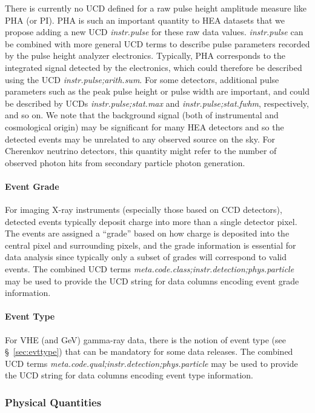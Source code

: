 \documentclass[11pt,a4paper]{ivoa}
\begin{document}
There is currently no UCD defined for a raw pulse height amplitude measure like PHA (or PI). PHA is such an important quantity to \gls{HEA} datasets that we propose adding a new UCD {\em instr.pulse\/} for these raw data values. {\em instr.pulse\/} can be combined with more general UCD terms to describe pulse parameters recorded by the pulse height analyzer electronics. Typically, PHA corresponds to the integrated signal detected by the electronics, which could therefore be described using the UCD {\em instr.pulse;arith.sum}. For some detectors, additional pulse parameters such as the peak pulse height or pulse width are important, and could be described by UCDs {\em instr.pulse;stat.max} and {\em instr.pulse;stat.fwhm}, respectively, and so on. We note that the background signal (both of instrumental and cosmological origin) may be significant for many \gls{HEA} detectors and so the detected events may be unrelated to any observed source on the sky. For Cherenkov neutrino detectors, this quantity might refer to the number of observed photon hits from secondary particle photon generation.

\paragraph{Event Grade}

For imaging X-ray instruments (especially those based on CCD detectors), detected events typically deposit charge into more than a single detector pixel.  The events are assigned a ``grade'' based on how charge is deposited into the central pixel and surrounding pixels, and the grade information is essential for data analysis since typically only a subset of grades will correspond to valid events.  The combined UCD terms {\em meta.code.class;instr.detection;phys.particle\/} may be used to provide the UCD string for data columns encoding event grade information.

\paragraph{Event Type}

For \gls{VHE} (and GeV) gamma-ray data, there is the notion of event type (see \S~\ref{sec:evttype}) that can be mandatory for some data releases.  The combined UCD terms {\em meta.code.qual;instr.detection;phys\-.particle\/} may be used to provide the UCD string for data columns encoding event type information.

\subsubsection{Physical Quantities}
\end{document}

